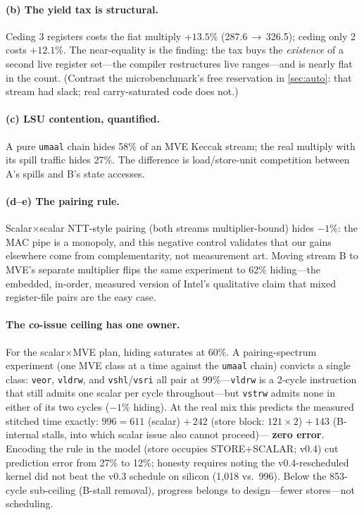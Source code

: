 \documentclass[11pt,a4paper]{article}
\begin{document}
\paragraph{(b) The yield tax is structural.} Ceding 3 registers costs the fiat
multiply $+13.5\%$ (287.6$\,\to\,$326.5); ceding only 2 costs $+12.1\%$. The
near-equality is the finding: the tax buys the \emph{existence} of a second
live register set---the compiler restructures live ranges---and is nearly flat
in the count. (Contrast the microbenchmark's free reservation in
\cref{sec:auto}: that stream had slack; real carry-saturated code does not.)

\paragraph{(c) LSU contention, quantified.} A pure \texttt{umaal} chain hides
58\% of an MVE Keccak stream; the real multiply with its spill traffic hides
27\%. The difference is load/store-unit competition between A's spills and B's
state accesses.

\paragraph{(d--e) The pairing rule.} Scalar$\times$scalar NTT-style pairing
(both streams multiplier-bound) hides $-1$\%: the MAC pipe is a monopoly, and
this negative control validates that our gains elsewhere come from
complementarity, not measurement art. Moving stream B to MVE's separate
multiplier flips the same experiment to 62\% hiding---the embedded, in-order,
measured version of Intel's qualitative claim that mixed register-file pairs
are the easy case.

\paragraph{The co-issue ceiling has one owner.} For the scalar$\times$MVE
plan, hiding saturates at 60\%. A pairing-spectrum experiment (one MVE class at
a time against the \texttt{umaal} chain) convicts a single class:
\texttt{veor}, \texttt{vldrw}, and \texttt{vshl}/\texttt{vsri} all pair at
99\%---\texttt{vldrw} is a 2-cycle instruction that still admits one scalar
per cycle throughout---but \texttt{vstrw} admits none in either of its two
cycles ($-1$\% hiding). At the real mix this predicts the measured stitched
time exactly: $996 = 611$ (scalar) $+\,242$ (store block: $121\times2$)
$+\,143$ (B-internal stalls, into which scalar issue also cannot proceed)---
\textbf{zero error}. Encoding the rule in the model (store occupies
STORE+SCALAR; v0.4) cut prediction error from 27\% to 12\%; honesty requires
noting the v0.4-rescheduled kernel did not beat the v0.3 schedule on silicon
(1,018 vs.\ 996). Below the 853-cycle sub-ceiling (B-stall removal), progress
belongs to design---fewer stores---not scheduling.
\end{document}
